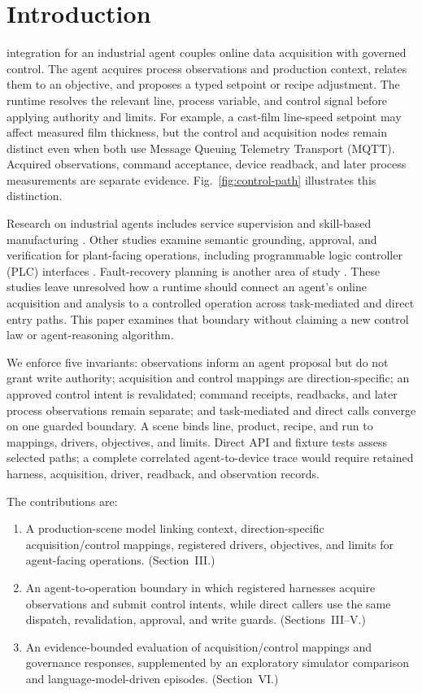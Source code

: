 \section{Introduction}
 integration for an industrial agent couples online data acquisition with governed control. The agent acquires process observations and production context, relates them to an objective, and proposes a typed setpoint or recipe adjustment. The runtime resolves the relevant line, process variable, and control signal before applying authority and limits. For example, a cast-film line-speed setpoint may affect measured film thickness, but the control and acquisition nodes remain distinct even when both use Message Queuing Telemetry Transport (MQTT). Acquired observations, command acceptance, device readback, and later process measurements are separate evidence. Fig.~\ref{fig:control-path} illustrates this distinction.

Research on industrial agents includes service supervision and skill-based manufacturing \cite{biskupovic2025supervision,koehle2026llmdriven}. Other studies examine semantic grounding, approval, and verification for plant-facing operations, including programmable logic controller (PLC) interfaces \cite{graul2026aas,schall2026safe}. Fault-recovery planning is another area of study \cite{vyas2026detection}. These studies leave unresolved how a runtime should connect an agent's online acquisition and analysis to a controlled operation across task-mediated and direct entry paths. This paper examines that boundary without claiming a new control law or agent-reasoning algorithm.

We enforce five invariants: observations inform an agent proposal but do not grant write authority; acquisition and control mappings are direction-specific; an approved control intent is revalidated; command receipts, readbacks, and later process observations remain separate; and task-mediated and direct calls converge on one guarded boundary. A scene binds line, product, recipe, and run to mappings, drivers, objectives, and limits. Direct API and fixture tests assess selected paths; a complete correlated agent-to-device trace would require retained harness, acquisition, driver, readback, and observation records.

The contributions are:
\begin{enumerate}
  \item A production-scene model linking context, direction-specific acquisition/control mappings, registered drivers, objectives, and limits for agent-facing operations. (Section~III.)
  \item An agent-to-operation boundary in which registered harnesses acquire observations and submit control intents, while direct callers use the same dispatch, revalidation, approval, and write guards. (Sections~III--V.)
  \item An evidence-bounded evaluation of acquisition/control mappings and governance responses, supplemented by an exploratory simulator comparison and language-model-driven episodes. (Section~VI.)
\end{enumerate}

